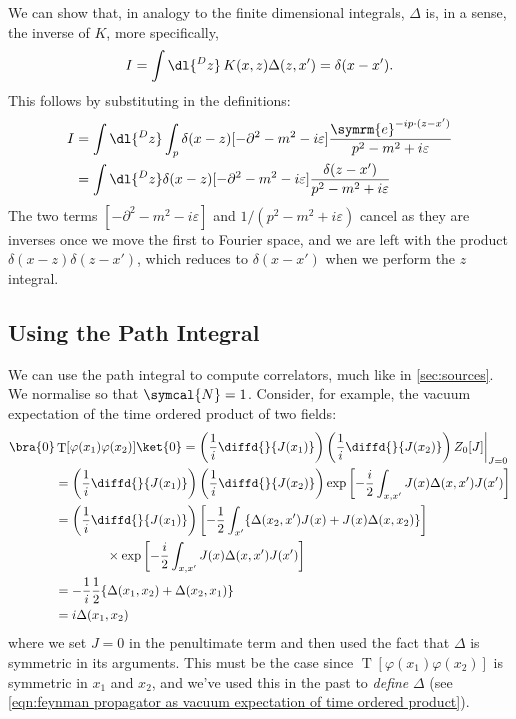 \documentclass[fleqn]{NotesClass}
\newcommand{\dalembertian}{\partial^2}
\newcommand{\e}{\symrm{e}}
\DeclareMathOperator{\timeOrdering}{T}
\begin{document}
    We can show that, in analogy to the finite dimensional integrals, \(\Delta\) is, in a sense, the inverse of \(K\), more specifically,
    \begin{equation}
        I = \int \dl{^Dz} \, K(x, z) \Delta(z, x') = \delta(x - x').
    \end{equation}
    This follows by substituting in the definitions:
    \begin{align}
        I &= \int \dl{^Dz} \int_p \delta(x - z)[-\dalembertian - m^2 - i\varepsilon] \frac{\e^{-ip\cdot (z - x')}}{p^2 - m^2 + i\varepsilon}\\
        &= \int \dl{^Dz} \delta(x - z)[-\dalembertian - m^2 - i\varepsilon] \frac{\delta(z - x')}{p^2 - m^2 + i\varepsilon}
    \end{align}
    The two terms \([-\dalembertian - m^2 - i\varepsilon]\) and \(1/(p^2 - m^2 + i\varepsilon)\) cancel as they are inverses once we move the first to Fourier space, and we are left with the product \(\delta(x - z)\delta(z - x')\), which reduces to \(\delta(x - x')\) when we perform the \(z\) integral.
    
    \subsection{Using the Path Integral}
    We can use the path integral to compute correlators, much like in \cref{sec:sources}.
    We normalise so that \(\symcal{N} = 1\).
    Consider, for example, the vacuum expectation of the time ordered product of two fields:
    \begin{align*}
        \bra{0} &\timeOrdering[\varphi(x_1)\varphi(x_2)] \ket{0} = \left( \frac{1}{i} \diffd{}{J(x_1)} \right) \left( \frac{1}{i} \diffd{}{J(x_2)} \right) Z_0[J] \bigg|_{J = 0}\\
        &= \left( \frac{1}{i} \diffd{}{J(x_1)} \right) \left( \frac{1}{i} \diffd{}{J(x_2)} \right) \exp\left[ -\frac{i}{2} \int_{x,x'} J(x)\Delta(x, x')J(x') \right]\\
        &= \left( \frac{1}{i} \diffd{}{J(x_1)} \right) \left[ -\frac{1}{2}\int_{x'} \{\Delta(x_2, x')J(x) + J(x)\Delta(x, x_2)\} \right]\\
        & \qquad \qquad \times \exp\left[ -\frac{i}{2} \int_{x,x'} J(x)\Delta(x, x')J(x') \right]\\
        &= -\frac{1}{i}\frac{1}{2}\{\Delta(x_1, x_2) + \Delta(x_2, x_1)\}\\
        &= i\Delta(x_1, x_2)
    \end{align*}
    where we set \(J = 0\) in the penultimate term and then used the fact that \(\Delta\) is symmetric in its arguments.
    This must be the case since \(\timeOrdering[\varphi(x_1)\varphi(x_2)]\) is symmetric in \(x_1\) and \(x_2\), and we've used this in the past to \emph{define} \(\Delta\) (see \cref{eqn:feynman propagator as vacuum expectation of time ordered product}).
    
    
    
    \appendixpage
    \begin{appendices}
        
        
    \end{appendices}
    
    \backmatter
    \renewcommand{\glossaryname}{Acronyms}
    \printglossary[acronym]
    \printindex
\end{document}

